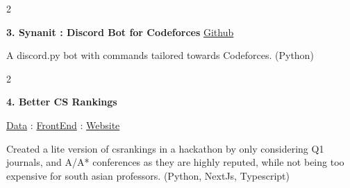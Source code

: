 \documentclass[10pt, letterpaper]{article}
\newenvironment{twocolentry}[2][]{
    \onecolentry
    \def\secondColumn{#2}
    \setcolumnwidth{\fill, 4.5 cm}
    \begin{paracol}{2}
}{
    \switchcolumn \raggedleft \secondColumn
    \end{paracol}
    \endonecolentry
} %
\begin{document}
        \begin{twocolentry}{
            \href{https://github.com/Darelife/synanit2.0}{Github}
        }
            \textbf{3. Synanit : Discord Bot for Codeforces}\end{twocolentry}

        \vspace{0.10 cm}
                A discord.py bot with commands tailored towards Codeforces. (Python)

        \vspace{0.3 cm}

        \begin{twocolentry}{%
            \href{https://github.com/Darelife/HackenzaHackathon}{Data} : 
            \href{https://github.com/arin-r/better-csrankings}{FrontEnd} : 
            \href{https://better-csrankings.vercel.app/}{Website}%
        }
            \textbf{4. Better CS Rankings}
        \end{twocolentry}



        \vspace{0.10 cm}
                Created a lite version of csrankings in a hackathon by only considering Q1 journals, and A/A* conferences as they are highly reputed, while not being too expensive for south asian professors. (Python, NextJs, Typescript)
\end{document}
